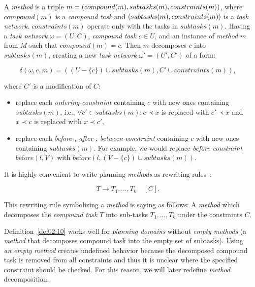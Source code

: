 \begin{defn}\label{def02:10}
    A \emph{method} is a triple $m = (compound(m),subtasks(m), \\ constraints(m))$, where $compound(m)$ is a \emph{compound  task} and $(subtasks(m), \\ constraints(m))$ is a \emph{task network}. $constraints(m)$ operate only with the tasks in $subtasks(m)$. Having a \emph{task network} $\omega=(U,C)$, \emph{compound task} $c \in U$, and an instance of \emph{method} $m$ from $M$ such that $compound(m) = c$. Then $m$ decomposes $c$ into $subtasks(m)$, creating a new \emph{task network} $\omega'=(U',C')$ of a form:

    \[
    \delta(\omega,c,m) = ((U-\{c\}) \cup subtasks(m), C' \cup constraints(m)),
    \]

    \noindent
    where $C'$ is a modification of $C$:

    \begin{itemize}
        \item replace each \emph{ordering-constraint} containing $c$ with new ones containing $subtasks(m)$, i.e., $\forall c' \in subtasks(m): c \prec x$ is replaced with $c' \prec x$ and $x \prec c$ is replaced with $x \prec c'$,
        
        \item replace each \emph{before-, after-, between-constraint} containing $c$ with new ones containing $subtasks(m)$. For example, we would replace \emph{before-constraint} $be\text{f}ore(l,V)$ with $be\text{f}ore(l,(V - \{c\}) \cup subtasks(m))$.
    \end{itemize}
\end{defn}

\medbreak\noindent
It is highly convenient to write planning \emph{methods} as rewriting rules~\cite{ondrckova2023semantics}:

\[
T \rightarrow T_1,\dots,T_k \quad [C].
\]

\noindent
This rewriting rule symbolizing a \emph{method} is saying as follows: A \emph{method} which decomposes the \emph{compound task} $T$ into sub-tasks $T_1,\dots,T_k$ under the constraints $C$.

\medbreak\noindent
Definition~\ref{def02:10} works well for \emph{planning domains} without \emph{empty methods} (a \emph{method} that decomposes compound task into the empty set of subtasks). Using \emph{an empty method} creates undefined behavior because the decomposed compound task is removed from all constraints and thus it is unclear where the specified constraint should be checked. For this reason, we will later redefine \emph{method} decomposition. 

